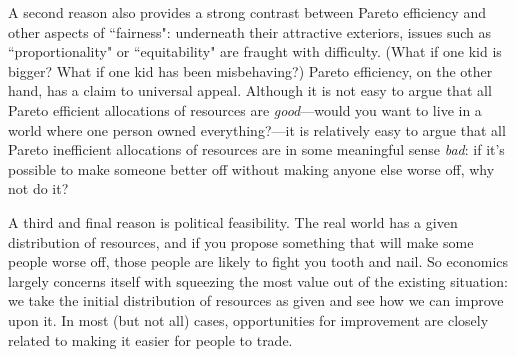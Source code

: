 A second reason also provides a strong contrast between Pareto efficiency and other aspects of ``fairness": underneath their attractive exteriors, issues such as ``proportionality" or ``equitability" are fraught with difficulty. (What if one kid is bigger? What if one kid has been misbehaving?) Pareto efficiency, on the other hand, has a claim to universal appeal. Although it is not easy to argue that all Pareto efficient allocations of resources are \emph{good}---would you want to live in a world where one person owned everything?---it is relatively easy to argue that all Pareto inefficient allocations of resources are in some meaningful sense \emph{bad}: if it's possible to make someone better off without making anyone else worse off, why not do it?

A third and final reason is political feasibility. The real world has a given distribution of resources, and if you propose something that will make some people worse off, those people are likely to fight you tooth and nail. So economics largely concerns itself with squeezing the most value out of the existing situation: we take the initial distribution of resources as given and see how we can improve upon it. In most (but not all) cases, opportunities for improvement are closely related to making it easier for people to trade.

\label{importanceoftradeend}

